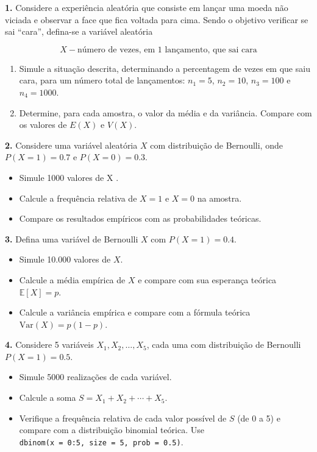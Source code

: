 \documentclass[
]{book}
\providecommand{\tightlist}{%
  \setlength{\itemsep}{0pt}\setlength{\parskip}{0pt}}
\begin{document}
\textbf{1.} Considere a experiência aleatória que consiste em lançar
uma moeda não viciada e observar a face que fica voltada para cima.
Sendo o objetivo verificar se sai ``cara'', defina-se a variável aleatória

\[X - \text{número de vezes, em 1 lançamento, que sai cara}\]

\begin{enumerate}
\def\labelenumi{(\alph{enumi})}
\item
  Simule a situação descrita, determinando a percentagem de vezes em que saiu cara, para um número total de lançamentos: \(n_1 = 5\), \(n_2=10\), \(n_3=100\) e \(n_4=1000\).
\item
  Determine, para cada amostra, o valor da média e da variância. Compare com os valores de \(E(X)\) e \(V(X)\).
\end{enumerate}

\textbf{2.} Considere uma variável aleatória \(X\) com distribuição de Bernoulli, onde \(P(X = 1) = 0.7\) e \(P(X = 0) = 0.3\).

\begin{itemize}
\tightlist
\item
  Simule 1000 valores de X .
\item
  Calcule a frequência relativa de \(X = 1\) e \(X = 0\) na amostra.
\item
  Compare os resultados empíricos com as probabilidades teóricas.
\end{itemize}

\textbf{3.} Defina uma variável de Bernoulli \(X\) com \(P(X = 1) = 0.4\).

\begin{itemize}
\tightlist
\item
  Simule 10.000 valores de \(X\).
\item
  Calcule a média empírica de \(X\) e compare com sua esperança teórica \(\mathbb{E}[X] = p\).
\item
  Calcule a variância empírica e compare com a fórmula teórica \(\text{Var}(X) = p(1 - p)\).
\end{itemize}

\textbf{4.} Considere 5 variáveis \(X_1, X_2, \ldots, X_5\), cada uma com distribuição de Bernoulli \(P(X = 1) = 0.5\).

\begin{itemize}
\tightlist
\item
  Simule 5000 realizações de cada variável.
\item
  Calcule a soma \(S = X_1 + X_2 + \cdots + X_5\).
\item
  Verifique a frequência relativa de cada valor possível de \(S\) (de 0 a 5) e compare com a distribuição binomial teórica. Use \texttt{dbinom(x\ =\ 0:5,\ size\ =\ 5,\ prob\ =\ 0.5)}.
\end{itemize}
\end{document}
